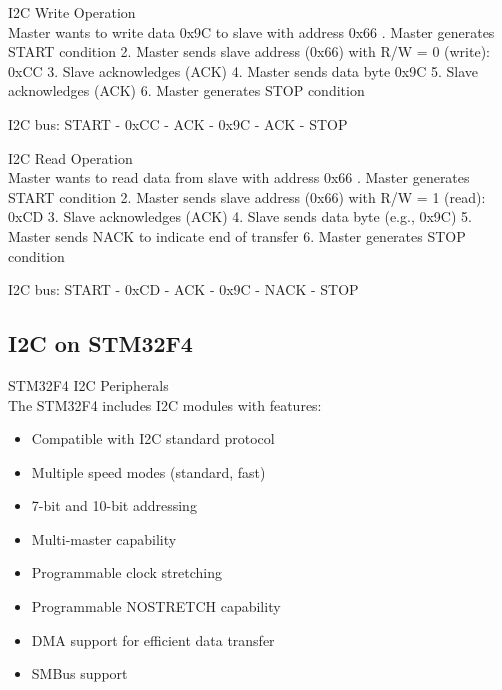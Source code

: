 \begin{example2}{I2C Write Operation}\\
Master wants to write data 0x9C to slave with address 0x66
. Master generates START condition
2. Master sends slave address (0x66) with R/W = 0 (write): 0xCC
3. Slave acknowledges (ACK)
4. Master sends data byte 0x9C
5. Slave acknowledges (ACK)
6. Master generates STOP condition

I2C bus:
START - 0xCC - ACK - 0x9C - ACK - STOP
\end{example2}

\begin{example2}{I2C Read Operation}\\
Master wants to read data from slave with address 0x66
. Master generates START condition
2. Master sends slave address (0x66) with R/W = 1 (read): 0xCD
3. Slave acknowledges (ACK)
4. Slave sends data byte (e.g., 0x9C)
5. Master sends NACK to indicate end of transfer
6. Master generates STOP condition

I2C bus:
START - 0xCD - ACK - 0x9C - NACK - STOP
\end{example2}

\subsection{I2C on STM32F4}

\begin{concept}{STM32F4 I2C Peripherals}\\
The STM32F4 includes I2C modules with features:
\begin{itemize}
    \item Compatible with I2C standard protocol
    \item Multiple speed modes (standard, fast)
    \item 7-bit and 10-bit addressing
    \item Multi-master capability
    \item Programmable clock stretching
    \item Programmable NOSTRETCH capability
    \item DMA support for efficient data transfer
    \item SMBus support
\end{itemize}
\end{concept}

